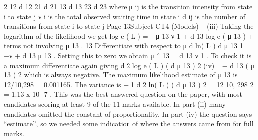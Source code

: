 2
12
d 12
21
d 21
13
d 13
23
d 23
where
μ ij is the transition intensity from state i to state j
ν i is the total observed waiting time in state i
d ij is the number of transitions from state i to state j
Page 13Subject CT4 (Models) – %
(iii)
Taking the logarithm of the likelihood we get
log e ( L ) = −μ 13 ν 1 + d 13 log e ( μ 13 ) + terms not involving μ 13 .
13
Differentiate with respect to μ
d ln( L )
d μ 13
1
= −ν +
d 13
μ 13
.
Setting this to zero we obtain
μ ˆ 13 =
d 13
ν 1
.
To check it is a maximum differentiate again giving
d 2 log e ( L )
( d μ 13 ) 2
(iv)
=−
d 13
( μ 13 ) 2
which is always negative.
The maximum likelihood estimate of μ 13 is 12/10,298 = 0.001165.
The variance is
− 1
d 2 ln( L )
( d μ 13 ) 2
= 12
10, 298 2
= 1.13 x 10 -7 .
This was the best answered question on the paper, with most candidates scoring at least 9 of
the 11 marks available. In part (ii) many candidates omitted the constant of proportionality.
In part (iv) the question says “estimate”, so we needed some indication of where the answers
came from for full marks.
